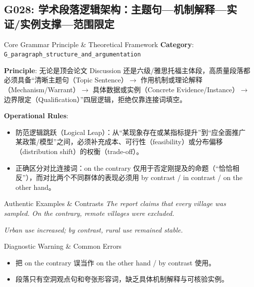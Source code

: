 \subsection{G028: 学术段落逻辑架构：主题句---机制解释---实证/实例支撑---范围限定}\label{sec:rule:G028}
\begin{ConceptBox}{Core Grammar Principle \& Theoretical Framework}
\textbf{Category}: \texttt{G\_paragraph\_structure\_and\_argumentation}\par\vspace{3pt}
\textbf{Principle}: 无论是顶会论文 Discussion 还是六级/雅思托福主体段，高质量段落都必须具备“清晰主题句（Topic Sentence）$\to$ 作用机制或理论解释（Mechanism/Warrant）$\to$ 具体数据或实例（Concrete Evidence/Instance）$\to$ 边界限定（Qualification）”四层逻辑，拒绝仅靠连接词填空。\par\vspace{4pt}
\textbf{Operational Rules}:
\begin{itemize}[leftmargin=1.5em, itemsep=1pt]
  \item 防范逻辑跳跃（Logical Leap）：从“某现象存在或某指标提升”到“应全面推广某政策/模型”之间，必须补充成本、可行性（feasibility）或分布偏移（distribution shift）的权衡（trade-off）。
  \item 正确区分对比连接词：on the contrary 仅用于否定刚提及的命题（“恰恰相反”），而对比两个不同群体的表现必须用 by contrast / in contrast / on the other hand。
\end{itemize}
\end{ConceptBox}
\begin{ExampleBox}{Authentic Examples \& Contrasts}
\textit{The report claims that every village was sampled. On the contrary, remote villages were excluded.}\par\vspace{2pt}
\textit{Urban use increased; by contrast, rural use remained stable.}\par\vspace{2pt}
\end{ExampleBox}
\begin{TipBox}{Diagnostic Warning \& Common Errors}
\begin{itemize}[leftmargin=1.5em, itemsep=1pt]
  \item 把 on the contrary 误当作 on the other hand / by contrast 使用。
  \item 段落只有空洞观点句和夸张形容词，缺乏具体机制解释与可核验实例。
\end{itemize}
\end{TipBox}
\vspace{6pt}
